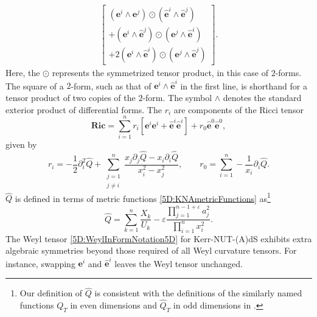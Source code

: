 \begin{equation}
\begin{split}
    \begin{bmatrix}
                            \left(\mathbf{e}^{i} \wedge \mathbf{e}^{j}\right) \odot
                            \left(\hat{\mathbf{e}}^{i} \wedge \hat{\mathbf{e}}^{j}\right)
                            \\
                            + \left(\mathbf{e}^{i} \wedge \hat{\mathbf{e}}^{j}\right)
                            \odot \left(\mathbf{e}^{j} \wedge \hat{\mathbf{e}}^{i}\right)
                            \\
                         + 2 \left(\mathbf{e}^{i} \wedge \hat{\mathbf{e}}^{i}\right) \odot
                         \left(\mathbf{e}^{j} \wedge \hat{\mathbf{e}}^{j}\right)
                     \end{bmatrix}.
    \end{split}
\end{equation}
%
Here, the $ \odot$ represents the symmetrized tensor product, in this case of $2$-forms. The square of a $2$-form,
such as that of $\mathbf{e}^{i} \wedge \mathbf{\hat{e}}^{i}$ in the first line, is shorthand for a tensor product
of two copies of the $2$-form. The symbol $\wedge$ denotes the standard exterior product of differential
forms. The $ r_{i}$ are components of the Ricci tensor
%
\begin{equation} 
    \mathbf{Ric} = \sum_{i = 1}^{n} r_{i} \left[ \mathbf{e}^{i} \mathbf{e}^{i} +
    \mathbf{\hat{e}}^{i} \mathbf{\hat{e}}^{i}\right] + r_{0} \mathbf{\hat{e}}^{0}
    \mathbf{\hat{e}}^{0},
\end{equation}
%
given by
%
\begin{equation} 
    r_{i} = - \frac{1}{2} \partial_{i}^{2} \hat{Q} + \sum_{ \substack{j = 1 \\ j\neq i}}^{n}
    \frac{x_{j} \partial_{j} \hat{Q} - x_{i} \partial_{i} \hat{Q}}{x_{i}^{2} - x_{j}^{2}}, 
    \qquad
    r_{0} =
    \sum_{i = 1}^{n} - \frac{1}{x_{i}} \partial_{i}\hat{Q}.
\end{equation}
%
$ \hat{Q}$ is defined in terms of metric functions \eqref{5D:KNAmetricFunctions} as\footnote{Our definition of
    $\hat{Q}$ is consistent with the definitions of the similarly named functions $Q_{T}$ in even dimensions and
$\hat{Q}_{T}$ in odd dimensions in \cite{Hamamoto:2006zf}.}
%
\begin{equation} 
    \hat{Q} = \sum_{k = 1}^{n} \frac{X_{k}}{U_{k}} - \varepsilon \frac{ \prod_{j = 1}^{n - 1 +
    \varepsilon} a_{j}^{2}}{ \prod_{i  = 1}^{n} x_{i}^{2}}.
\end{equation}
%
The Weyl tensor \eqref{5D:WeylInFormNotation5D}  for Kerr-NUT-(A)dS exhibits extra algebraic symmetries beyond those required of all Weyl curvature tensors. For instance, swapping
$\mathbf{e}^{i}$ and $\mathbf{\hat{e}}^{i}$ leaves the Weyl tensor unchanged.


